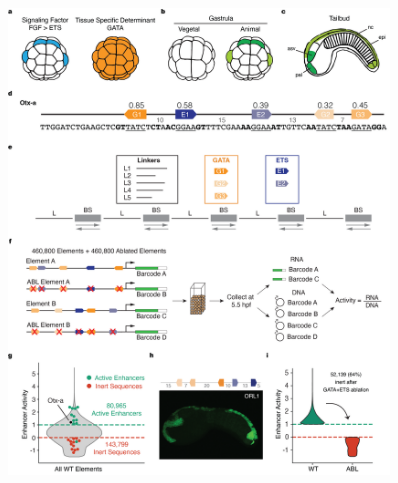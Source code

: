 \begin{figure}[p]
    \centering
    \includegraphics[width=0.9\textwidth, height=0.745\textheight]{2_figures-and-files/Fig1.png}

\end{figure}

